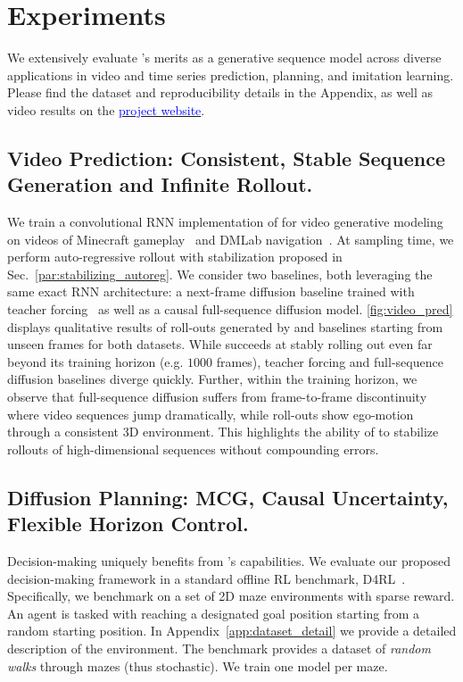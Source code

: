 
\section{Experiments}
We extensively evaluate \algons's merits as a generative sequence model across diverse applications in video and time series prediction, planning, and imitation learning. Please find the dataset and reproducibility details in the Appendix, as well as video results on the \href{https://boyuan.space/diffusion-forcing}{\textcolor{blue}{project website}}.



\subsection{Video Prediction: Consistent, Stable Sequence Generation and Infinite Rollout.}
\label{exp:video}
We train a convolutional RNN implementation of \algoseq{} for video generative modeling on videos of Minecraft gameplay~\cite{yan2023temporally} and DMLab navigation~\cite{yan2023temporally}. At sampling time, we perform auto-regressive rollout with stabilization proposed in Sec.~\ref{par:stabilizing_autoreg}.
We consider two baselines, both leveraging the same exact RNN architecture: a next-frame diffusion baseline trained with teacher forcing~\cite{teacher_forcing} as well as a causal full-sequence diffusion model. \cref{fig:video_pred} displays qualitative results of roll-outs generated by \algo{} and baselines starting from unseen frames for both datasets. While \algons{} succeeds at stably rolling out even far beyond its training horizon (e.g. $1000$ frames), teacher forcing and full-sequence diffusion baselines diverge quickly. Further, within the training horizon, we observe that full-sequence diffusion suffers from frame-to-frame discontinuity where video sequences jump dramatically, while \algo{} roll-outs show ego-motion through a consistent 3D environment. This highlights the ability of \algo{} to stabilize rollouts of high-dimensional sequences without compounding errors.




\subsection{Diffusion Planning: MCG, Causal Uncertainty, Flexible Horizon Control.}
\label{sec:exp_decision_making}
Decision-making uniquely benefits from \algo{}'s capabilities. We evaluate our proposed decision-making framework in a standard offline RL benchmark, D4RL~\cite{d4rl}. Specifically, we benchmark \algo{} on a set of 2D maze environments with sparse reward. An agent is tasked with reaching a designated goal position starting from a random starting position. In Appendix~\ref{app:dataset_detail} we provide a detailed description of the environment. The benchmark provides a dataset of \emph{random walks} through mazes (thus stochastic). We train one model per maze. 

